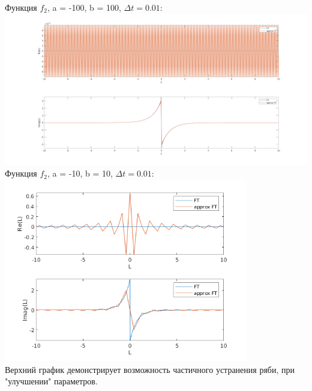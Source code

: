 \documentclass[11pt]{article}
\begin{document}
	\begin{center}
		{Функция $f_2$, a = -100, b = 100, $\Delta t = 0.01$:}
		\newline
		\includegraphics[width=1\textwidth]{r_1.png}\\
		{Функция $f_2$, a = -10, b = 10, $\Delta t = 0.01$:}
		\newline
		\includegraphics[width=0.8\textwidth]{r_2.png}\\
		{Верхний график демонстрирует возможность частичного устранения ряби, при "улучшении" параметров.}
	\end{center}
\end{document}

